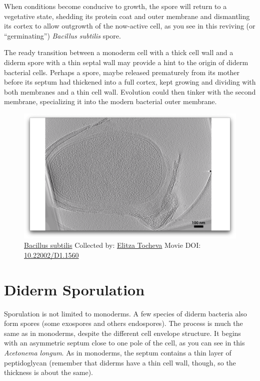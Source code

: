 \documentclass[]{tufte-book}
\begin{document}
When conditions become conducive to growth, the spore will return to a
vegetative state, shedding its protein coat and outer membrane and
dismantling its cortex to allow outgrowth of the now-active cell, as you
see in this reviving (or ``germinating'') \emph{Bacillus subtilis}
spore.

The ready transition between a monoderm cell with a thick cell wall and
a diderm spore with a thin septal wall may provide a hint to the origin
of diderm bacterial cells. Perhaps a spore, maybe released prematurely
from its mother before its septum had thickened into a full cortex, kept
growing and dividing with both membranes and a thin cell wall. Evolution
could then tinker with the second membrane, specializing it into the
modern bacterial outer membrane.





\begin{figure}
\includegraphics{movie_stills/8_8} \caption[\protect\hyperlink{tree}{Bacillus subtilis} Collected by:
\protect\hyperlink{elitza_tocheva}{Elitza Tocheva} Movie DOI:
\href{https://doi.org/10.22002/D1.1560}{10.22002/D1.1560}]{\protect\hyperlink{tree}{Bacillus subtilis} Collected by:
\protect\hyperlink{elitza_tocheva}{Elitza Tocheva} Movie DOI:
\href{https://doi.org/10.22002/D1.1560}{10.22002/D1.1560}}\label{fig:8-8}
\end{figure}

\section{Diderm Sporulation}\label{diderm-sporulation}

Sporulation is not limited to monoderms. A few species of diderm
bacteria also form spores (some exospores and others endospores). The
process is much the same as in monoderms, despite the different cell
envelope structure. It begins with an asymmetric septum close to one
pole of the cell, as you can see in this \emph{Acetonema longum}. As in
monoderms, the septum contains a thin layer of peptidoglycan (remember
that diderms have a thin cell wall, though, so the thickness is about
the same).
\end{document}
